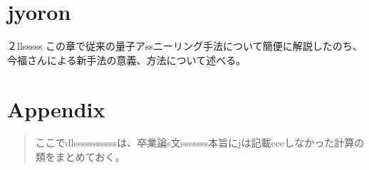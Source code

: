 \documentclass[uplatex,openany,oneside,a4j,11pt]{jsbook}
\begin{document}
\chapter{jyoron}
    ２llsssss
    この章で従来の\cite{nakamura1999coherent}量子アssニーリング手法について簡便に解説したのち、今福さんによる新手法の意義、方法について述べる。\\
    
\chapter{Appendix}
\begin{abstract}
    ここでdlsssssssssssは、卒業論s文sssssss本旨にjは記載eeeしなかった計算の類をまとめておく。

\end{abstract}
\begin{appendix}
    
\end{appendix}
%
\printbibliography[title=参考文献]
\end{document}
